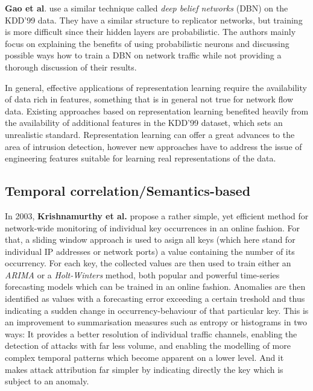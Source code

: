 \documentclass[a4paper,12pt,twoside]{report}
\begin{document}
\textbf{Gao et al}. \cite{gao_intrusion_2014} use a similar technique called \textit{deep belief networks} (DBN) on the KDD'99 data. They have a similar structure to replicator networks, but training is more difficult since their hidden layers are probabilistic. The authors mainly focus on explaining the benefits of using probabilistic neurons and discussing possible ways how to train a DBN on network traffic while not providing a thorough discussion of their results.

In general, effective applications of representation learning require the availability of data rich in features, something that is in general not true for network flow data. Existing approaches based on representation learning benefited heavily from the availability of additional features in the KDD'99 dataset, which sets an unrealistic standard. Representation learning can offer a great advances to the area of intrusion detection, however new approaches have to address the issue of engineering features suitable for learning real representations of the data.





\subsection{Temporal correlation/Semantics-based}



In 2003, \textbf{Krishnamurthy et al.} \cite{krishnamurthy2003sketch} propose a rather simple, yet efficient method for network-wide monitoring of individual key occurrences in an online fashion. For that, a sliding window approach is used to asign all keys (which here stand for individual IP addresses or network ports) a value containing the number of its occurrency. For each key, the collected values are then used to train either an \textit{ARIMA} or a \textit{Holt-Winters} method, both popular and powerful time-series forecasting models which can be trained in an online fashion. Anomalies are then identified as values with a forecasting error exceeding a certain treshold and thus indicating a sudden change in occurrency-behaviour of that particular key. This is an improvement to summarisation measures such as entropy or histograms in two ways: It provides a better resolution of individual traffic channels, enabling the detection of attacks with far less volume, and enabling the modelling of more complex temporal patterns which become apparent on a lower level. And it makes attack attribution far simpler by indicating directly the key which is subject to an anomaly. 
\end{document}

